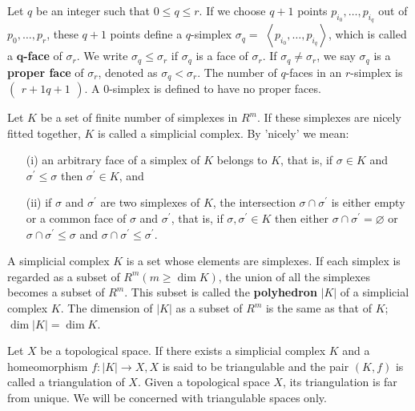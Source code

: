 \documentclass[hyperref, a4paper]{article}
\newcommand*{\concept}[1]{{\textbf{#1}}}
\def\\{}%
\def\mathbb#1{#1}%
\begin{document}
Let $q$ be an integer such that $0 \leq q \leq r$. If we choose $q+1$ points $p_{i_{0}}, \ldots, p_{i_{q}}$ out of 
$p_{0}, \ldots, p_{r}$, these $q+1$ points define a $q$-simplex 
$\sigma_{q}=$ $\left\langle p_{i_{0}}, \ldots, p_{i_{q}}\right\rangle$, 
which is called a \concept{$\boldsymbol{q}$-face} of $\sigma_{r}$. We write $\sigma_{q} \leq \sigma_{r}$ 
if $\sigma_{q}$ is a face of $\sigma_r$. If $\sigma_{q} \neq \sigma_{r}$, we say $\sigma_{q}$ is a \concept{proper face} of $\sigma_{r}$, 
denoted as $\sigma_{q}<\sigma_{r}$.
The number of $q$-faces in an $r$-simplex is $\left(\begin{array}{c} r+1 \\ q+1\end{array}\right)$. A 0-simplex is defined to have no proper faces.

Let $K$ be a set of finite number of simplexes in $\mathbb{R}^{m}$. If these simplexes are nicely fitted together, $K$ is called a simplicial complex. By 'nicely' we mean:
\begin{itemize}
    \item[(i)] an arbitrary face of a simplex of $K$ belongs to $K$, that is, if $\sigma \in K$ and $\sigma^{\prime} \leq \sigma$ then $\sigma^{\prime} \in K $, and
    \item[(ii)] if $\sigma$ and $\sigma^{\prime}$ are two simplexes of $K$, the intersection $\sigma \cap \sigma^{\prime}$ is either empty or a common face of $\sigma$ and $\sigma^{\prime}$, that is, if $\sigma, \sigma^{\prime} \in K$ then either $\sigma \cap \sigma^{\prime}=\varnothing$ or $\sigma \cap \sigma^{\prime} \leq \sigma$ and $\sigma \cap \sigma^{\prime} \leq \sigma^{\prime}$.
\end{itemize}

A simplicial complex $K$ is a set whose elements are simplexes. 
If each simplex is regarded as a subset of $\mathbb{R}^{m}(m \geq \operatorname{dim} K)$, 
the union of all the simplexes becomes a subset of $\mathbb{R}^{m}$. 
This subset is called the \concept{polyhedron} $|K|$ of a simplicial complex $K $. 
The dimension of $|K|$ as a subset of $\mathbb{R}^{m}$ is the same as that of $K$; $\operatorname{dim}|K|=\operatorname{dim} K$.

Let $X$ be a topological space. If there exists a simplicial complex $K$ and a homeomorphism $f:|K| \rightarrow X, X$ is said to be triangulable and the pair $(K, f)$ is called a triangulation of $X$. Given a topological space $X$, its triangulation is far from unique. We will be concerned with triangulable spaces only.
\end{document}

